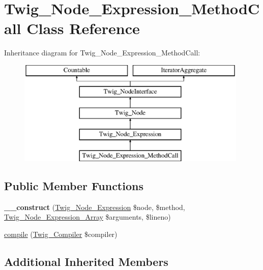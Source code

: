 \hypertarget{class_twig___node___expression___method_call}{}\section{Twig\+\_\+\+Node\+\_\+\+Expression\+\_\+\+Method\+Call Class Reference}
\label{class_twig___node___expression___method_call}
Inheritance diagram for Twig\+\_\+\+Node\+\_\+\+Expression\+\_\+\+Method\+Call\+:\begin{figure}[H]
\begin{center}
\leavevmode
\includegraphics[height=5.000000cm]{class_twig___node___expression___method_call}
\end{center}
\end{figure}
\subsection*{Public Member Functions}
\begin{DoxyCompactItemize}
\item 
\hypertarget{class_twig___node___expression___method_call_aa787d6cb923f5248b7304bcc4b5bfa12}{}{\bfseries \+\_\+\+\_\+construct} (\hyperlink{class_twig___node___expression}{Twig\+\_\+\+Node\+\_\+\+Expression} \$node, \$method, \hyperlink{class_twig___node___expression___array}{Twig\+\_\+\+Node\+\_\+\+Expression\+\_\+\+Array} \$arguments, \$lineno)\label{class_twig___node___expression___method_call_aa787d6cb923f5248b7304bcc4b5bfa12}

\item 
\hyperlink{class_twig___node___expression___method_call_a4e0faa87c3fae583620b84d3607085da}{compile} (\hyperlink{class_twig___compiler}{Twig\+\_\+\+Compiler} \$compiler)
\end{DoxyCompactItemize}
\subsection*{Additional Inherited Members}


